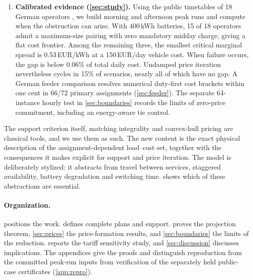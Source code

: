 \documentclass[11pt]{article}
\theoremstyle{definition}\newtheorem{definition}[theorem]{Definition}
\theoremstyle{remark}\newtheorem{remark}[theorem]{Remark}
\begin{document}
\begin{enumerate}[leftmargin=*,itemsep=2pt]
cardinality and total transition draw. For a complete, physically feasible
lossless charge-only perfect layer we characterize exactly when a single
matching suffices. A separate complete-graph construction gives a positive
support gap with curvature in the midday load. With a
third service batch, fleet feasibility alone is strongly NP-complete. On one
public 37-service timetable outside the two-batch class, rational certificates
establish a strictly positive gap.
\item \textbf{Calibrated evidence (\cref{sec:study}).} Using the public
timetables of 18 German operators \citep{sistig2025dataset,sistig2025electrification},
we build morning and afternoon peak runs and compute when the obstruction can
arise. With 400\,kWh batteries, 15 of 18 operators admit a maximum-size
pairing with zero mandatory midday charge, giving a flat cost frontier.
Among the remaining three, the smallest critical marginal spread is
0.53\,EUR/kWh at a 150\,EUR/day vehicle cost. When failure
occurs, the gap is below 0.06\% of total daily cost. Undamped price iteration
nevertheless cycles in 15\% of scenarios, nearly all of which have no gap.
A German feeder comparison resolves numerical duty-first cost brackets
within one cent in 66/72 primary assignments (\cref{sec:feeder}).
The separate 64-instance hourly test in \cref{sec:boundaries} records the
limits of zero-price commitment, including an energy-aware tie control.
\end{enumerate}

The support criterion itself, matching integrality and convex-hull pricing are
classical tools, and we use them as such. The new content is the exact physical
description of the assignment-dependent load--cost set, together with the
consequences it makes explicit for support and price iteration. The model is
deliberately stylized: it abstracts from travel between services, staggered
availability, battery degradation and switching time. 
shows which of these abstractions are essential.

\paragraph{Organization.}  positions the work.
 defines complete plans and support. 
proves the projection theorem, \cref{sec:prices} the price-formation results,
and \cref{sec:boundaries} the limits of the reduction.  reports
the tariff sensitivity study, and \cref{sec:discussion} discusses implications.
The appendices give the proofs and distinguish reproduction from the committed
peak-run inputs from verification of the separately held public-case certificates
(\cref{app:repro}).
\end{document}
